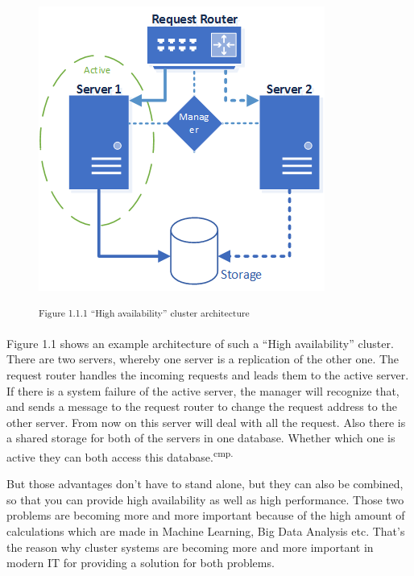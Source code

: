 
\begin{figure}[h]
\centering
\includegraphics[width=\textwidth/2]{images/ha_cluster_architecture.png}

\textsuperscript{Figure 1.1.1 ``High availability'' cluster architecture}
\end{figure}

Figure 1.1 shows an example architecture of such a ``High availability'' cluster. There are two servers, whereby one server is a replication of the other one. The request router handles the incoming requests and leads them to the active server. If there is a system failure of the active server, the manager will recognize that, and sends a message to the request router to change the request address to the other server. From now on this server will deal with all the request. Also there is a shared storage for both of the servers in one database. Whether which one is active they can both access this database.\textsuperscript{cmp.\cite{4}}



But those advantages don't have to stand alone, but they can also be combined, so that you can provide high availability as well as high performance. Those two problems are becoming more and more important because of the high amount of calculations which are made in Machine Learning, Big Data Analysis etc. That's the reason why cluster systems are becoming more and more important in modern IT for providing a solution for both problems.

